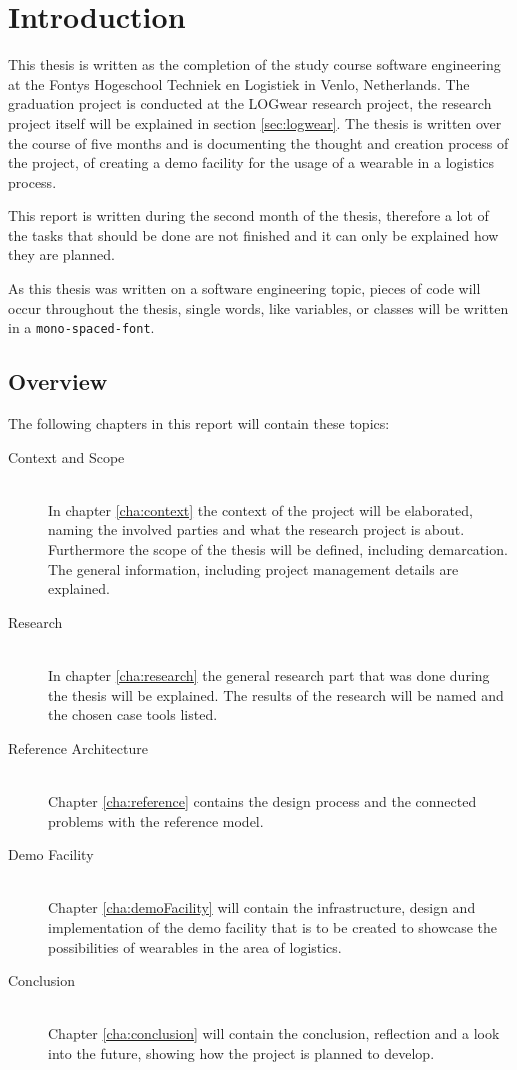 \chapter{Introduction}
This thesis is written as the completion of the study course software engineering at the Fontys Hogeschool Techniek en Logistiek in Venlo, Netherlands. The graduation project is conducted at the LOGwear research project, the research project itself will be explained in section \ref{sec:logwear}. The thesis is written over the course of five months and is documenting the thought and creation process of the project, of creating a demo facility for the usage of a wearable in a logistics process.

This report is written during the second month of the thesis, therefore a lot of the tasks that should be done are not finished and it can only be explained how they are planned.

As this thesis was written on a software engineering topic, pieces of code will occur throughout the thesis, single words, like variables, or classes will be written in a \texttt{mono-spaced-font}.
\section*{Overview}
The following chapters in this report will contain these topics:

\begin{description}
	\item[Context and Scope] \hfill \\
	In chapter \ref{cha:context} the context of the project will be elaborated, naming the involved parties and what the research project is about. Furthermore the scope of the thesis will be defined, including demarcation. The general information, including project management details are explained.
	\item[Research] \hfill \\
	In chapter \ref{cha:research} the general research part that was done during the thesis will be explained. The results of the research will be named and the chosen \gls{case} tools listed.
	\item[Reference Architecture] \hfill \\
	Chapter \ref{cha:reference} contains the design process and the connected problems with the reference model.
	\item[Demo Facility] \hfill \\
	Chapter \ref{cha:demoFacility} will contain the infrastructure, design and implementation of the demo facility that is to be created to showcase the possibilities of wearables in the area of logistics.
	\item[Conclusion] \hfill \\
	Chapter \ref{cha:conclusion} will contain the conclusion, reflection and a look into the future, showing how the project is planned to develop.
\end{description}